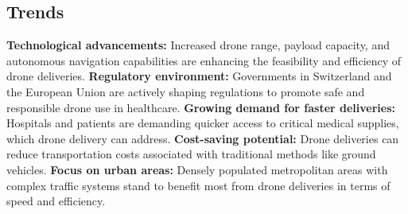 \subsection{Trends}
\textbf{Technological advancements:} Increased drone range, payload capacity, and autonomous navigation capabilities are enhancing the feasibility and efficiency of drone deliveries.
\newline
\textbf{Regulatory environment:} Governments in Switzerland and the European Union are actively shaping regulations to promote safe and responsible drone use in healthcare.
\newline
\textbf{Growing demand for faster deliveries:} Hospitals and patients are demanding quicker access to critical medical supplies, which drone delivery can address.
\newline
\textbf{Cost-saving potential:} Drone deliveries can reduce transportation costs associated with traditional methods like ground vehicles.
\newline
\textbf{Focus on urban areas:} Densely populated metropolitan areas with complex traffic systems stand to benefit most from drone deliveries in terms of speed and efficiency.
